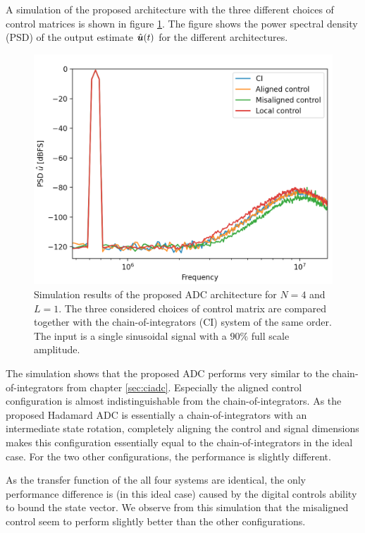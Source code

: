 A simulation of the proposed architecture with the three different choices of control matrices is shown in figure \ref{fig:HCI_SIM1}. The figure shows the power spectral density (PSD) of the output estimate $\hat{\bm{u}}(t)$ for the different architectures.
\begin{figure}[htbp]
    \centering
    \includegraphics[width=\linewidth]{figures/05hadamard/ideal_sim.png}
    \caption{Simulation results of the proposed ADC architecture for $N=4$ and $L=1$. The three considered choices of control matrix are compared together with the chain-of-integrators (CI) system of the same order. The input is a single sinusoidal signal with a $90\%$ full scale amplitude. }
    \label{fig:HCI_SIM1}
\end{figure}
The simulation shows that the proposed ADC performs very similar to the chain-of-integrators from chapter \ref{sec:ciadc}. Especially the aligned control configuration is almost indistinguishable from the chain-of-integrators. As the proposed Hadamard ADC is essentially a chain-of-integrators with an intermediate state rotation, completely aligning the control and signal dimensions makes this configuration essentially equal to the chain-of-integrators in the ideal case. For the two other configurations, the performance is slightly different.

As the transfer function of the all four systems are identical, the only performance difference is (in this ideal case) caused by the digital controls ability to bound the state vector. We observe from this simulation that the misaligned control seem to perform slightly better than the other configurations.


